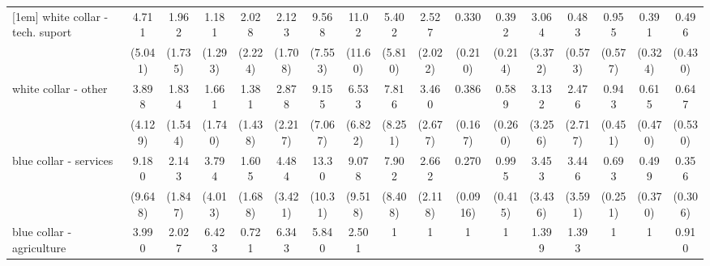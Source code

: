 {\begin{tabular}{l*{16}{c}}
[1em]
white collar - tech. suport&       4.711         &       1.962         &       1.181         &       2.028         &       2.123         &       9.568\sym{**} &       11.02\sym{*}  &       5.402         &       2.527         &       0.330         &       0.392         &       3.064         &       0.483         &       0.955         &       0.391         &       0.496         \\
                    &     (5.041)         &     (1.735)         &     (1.293)         &     (2.224)         &     (1.708)         &     (7.553)         &     (11.60)         &     (5.810)         &     (2.022)         &     (0.210)         &     (0.214)         &     (3.372)         &     (0.573)         &     (0.577)         &     (0.324)         &     (0.430)         \\
[1em]
white collar - other&       3.898         &       1.834         &       1.661         &       1.381         &       2.878         &       9.155\sym{**} &       6.533         &       7.816         &       3.460         &       0.386\sym{*}  &       0.589         &       3.132         &       2.476         &       0.943         &       0.615         &       0.647         \\
                    &     (4.129)         &     (1.544)         &     (1.740)         &     (1.438)         &     (2.217)         &     (7.067)         &     (6.822)         &     (8.251)         &     (2.677)         &     (0.167)         &     (0.260)         &     (3.256)         &     (2.717)         &     (0.451)         &     (0.470)         &     (0.530)         \\
[1em]
blue collar - services&       9.180\sym{*}  &       2.143         &       3.794         &       1.605         &       4.484\sym{*}  &       13.30\sym{***}&       9.078\sym{*}  &       7.902         &       2.662         &       0.270\sym{***}&       0.995         &       3.453         &       3.446         &       0.693         &       0.499         &       0.356         \\
                    &     (9.648)         &     (1.847)         &     (4.013)         &     (1.688)         &     (3.421)         &     (10.31)         &     (9.518)         &     (8.408)         &     (2.118)         &    (0.0916)         &     (0.415)         &     (3.436)         &     (3.591)         &     (0.251)         &     (0.370)         &     (0.306)         \\
[1em]
blue collar - agriculture&       3.990         &       2.027         &       6.423         &       0.721         &       6.343         &       5.840         &       2.501         &           1         &           1         &           1         &           1         &       1.399         &       1.393         &           1         &           1         &       0.910         \\

\end{tabular}}
